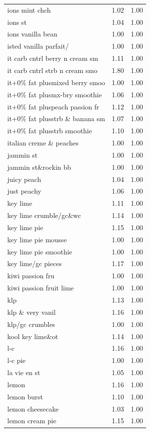 \begin{table}
\begin{tabular}{lrr}
ions mint chch & 1.02 & 1.00 \\
ions st & 1.04 & 1.00 \\
ions vanilla bean & 1.00 & 1.00 \\
isted vanilla parfait/ & 1.00 & 1.00 \\
it carb cntrl berry n cream sm & 1.11 & 1.00 \\
it carb cntrl strb n cream smo & 1.80 & 1.00 \\
it+0\% fat plusmixed berry smoo & 1.00 & 1.00 \\
it+0\% fat plusmx-bry smoothie & 1.06 & 1.00 \\
it+0\% fat pluspeach passion fr & 1.12 & 1.00 \\
it+0\% fat plusstrb \& banana sm & 1.07 & 1.00 \\
it+0\% fat plusstrb smoothie & 1.10 & 1.00 \\
italian creme \& peaches & 1.00 & 1.00 \\
jammin st & 1.00 & 1.00 \\
jammin st\&rockin bb & 1.00 & 1.00 \\
juicy peach & 1.04 & 1.00 \\
just peachy & 1.06 & 1.00 \\
key lime & 1.11 & 1.00 \\
key lime crumble/gc\&wc & 1.14 & 1.00 \\
key lime pie & 1.15 & 1.00 \\
key lime pie mousse & 1.00 & 1.00 \\
key lime pie smoothie & 1.00 & 1.00 \\
key lime/gc pieces & 1.17 & 1.00 \\
kiwi passion fru & 1.00 & 1.00 \\
kiwi passion fruit lime & 1.00 & 1.00 \\
klp & 1.13 & 1.00 \\
klp \& very vanil & 1.16 & 1.00 \\
klp/gc crumbles & 1.00 & 1.00 \\
kool key lime\&ot & 1.14 & 1.00 \\
l-c & 1.16 & 1.00 \\
l-c pie & 1.00 & 1.00 \\
la vie en st & 1.05 & 1.00 \\
lemon & 1.16 & 1.00 \\
lemon burst & 1.10 & 1.00 \\
lemon cheesecake & 1.03 & 1.00 \\
lemon cream pie & 1.15 & 1.00 \\

\end{tabular}
\end{table}

